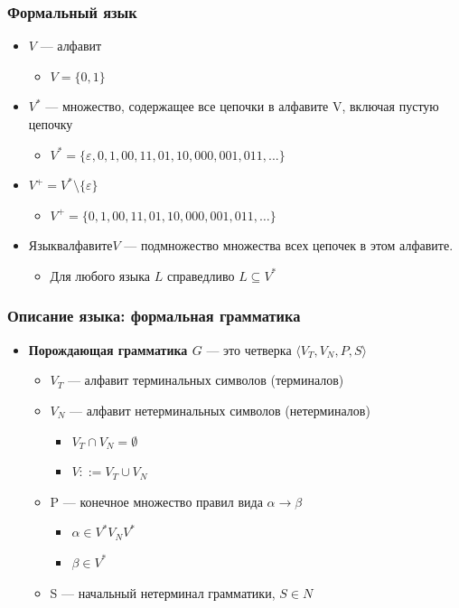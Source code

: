 \documentclass{beamer}
\begin{document}
\begin{frame}[fragile]
  \transwipe[direction=90]
  \frametitle{Формальный язык}
  \begin{itemize}
    \item $V$ --- алфавит
    \begin{itemize}
      \item $V = \{ 0, 1 \}$
    \end{itemize}
    \item $V^*$ --- множество, содержащее все цепочки в алфавите V, включая пустую цепочку
    \begin{itemize}
      \item $V^*=  \{ \varepsilon, 0, 1, 00, 11, 01, 10, 000, 001, 011, ... \}$
    \end{itemize}
    \item $V^+ = V^* \setminus \{ \varepsilon \} $ 
    \begin{itemize}
      \item $V^+ = \{0, 1, 00, 11, 01, 10, 000, 001, 011, \dots \}$
    \end{itemize}
    \item $Язык в алфавите V$ --- подмножество множества всех цепочек в этом алфавите. 
    \begin{itemize} 
      \item Для любого языка $L$ справедливо $L \subseteq V^*$
    \end{itemize}
  \end{itemize}
\end{frame}

\begin{frame}[fragile]
  \transwipe[direction=90]
  \frametitle{Описание языка: формальная грамматика}
  \begin{itemize}
    \item \textbf{Порождающая грамматика $G$} --- это четверка $\langle V_T, V_N, P, S \rangle$

   \begin{itemize}
     \item $V_T$ --- алфавит терминальных символов (терминалов) 
     \item $V_N$ --- алфавит нетерминальных символов (нетерминалов)
     \begin{itemize} 
        \item $V_T \cap V_N = \emptyset$ 
        \item $V ::= V_T \cup V_N$
     \end{itemize}
     \item P --- конечное множество правил вида $\alpha \rightarrow \beta$
     \begin{itemize}
       \item $\alpha \in V^* V_N V^*$
       \item $\beta \in V^*$
     \end{itemize}  
     \item S --- начальный нетерминал грамматики, $S  \in N$
  \end{itemize}
  \end{itemize}
\end{frame}
\end{document}
